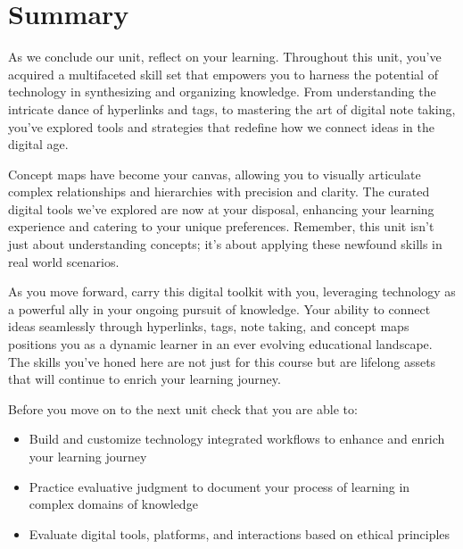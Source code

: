 \documentclass[
  letterpaper,
  DIV=11,
  numbers=noendperiod]{scrreprt}
\providecommand{\tightlist}{%
  \setlength{\itemsep}{0pt}\setlength{\parskip}{0pt}}\usepackage{longtable,booktabs,array}
\begin{document}
\section*{Summary}\label{summary-2}


As we conclude our unit, reflect on your learning. Throughout this unit,
you've acquired a multifaceted skill set that empowers you to harness
the potential of technology in synthesizing and organizing knowledge.
From understanding the intricate dance of hyperlinks and tags, to
mastering the art of digital note taking, you've explored tools and
strategies that redefine how we connect ideas in the digital age.

Concept maps have become your canvas, allowing you to visually
articulate complex relationships and hierarchies with precision and
clarity. The curated digital tools we've explored are now at your
disposal, enhancing your learning experience and catering to your unique
preferences. Remember, this unit isn't just about understanding
concepts; it's about applying these newfound skills in real world
scenarios.

As you move forward, carry this digital toolkit with you, leveraging
technology as a powerful ally in your ongoing pursuit of knowledge. Your
ability to connect ideas seamlessly through hyperlinks, tags, note
taking, and concept maps positions you as a dynamic learner in an ever
evolving educational landscape. The skills you've honed here are not
just for this course but are lifelong assets that will continue to
enrich your learning journey.

\begin{tcolorbox}[enhanced jigsaw, toprule=.15mm, colback=white, colframe=quarto-callout-note-color-frame, bottomtitle=1mm, leftrule=.75mm, coltitle=black, titlerule=0mm, rightrule=.15mm, colbacktitle=quarto-callout-note-color!10!white, left=2mm, title={Checking Your Learning}, opacitybacktitle=0.6, opacityback=0, breakable, toptitle=1mm, arc=.35mm, bottomrule=.15mm]

Before you move on to the next unit check that you are able to:

\begin{itemize}
\tightlist
\item
  Build and customize technology integrated workflows to enhance and
  enrich your learning journey
\item
  Practice evaluative judgment to document your process of learning in
  complex domains of knowledge
\item
  Evaluate digital tools, platforms, and interactions based on ethical
  principles
\end{itemize}

\end{tcolorbox}
\end{document}
